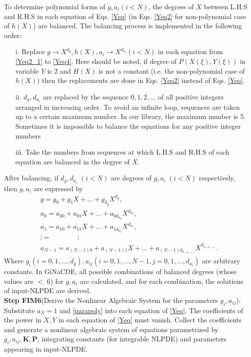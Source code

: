 \documentclass[prd,aps,floats,showkeys,nofootinbib,notitlepage]{revtex4}
\begin{document}
	To determine polynomial forms of $g,a_i(i<N)$, the degrees of $X$ between L.H.S and R.H.S in each equation of Eqs. \eqref{Yeq} (in Eqs. \eqref{Yeq2} for non-polynomial case of $h(X)$) are balanced. The balancing process is implemented in the following order:
	\begin{itemize}
		\item[i.] Replace $g\rightarrow X^{d_g},h(X),a_i\rightarrow X^{d_{a{_i}}}(i<N)$ in each equation from \eqref{Yeq2_1} to \eqref{Yeq4}. Here should be noted, if degree of $P(X(\xi),Y(\xi))$ in variable $Y$ is 2 and $H(X)$ is not a constant (i.e. the non-polynomial case of $h(X)$) then the replacements are done in Eqs. \eqref{Yeq2} instead of Eqs. \eqref{Yeq}.  
		\item[ii.]$d_g,d_{a_{i}}$ are replaced by the sequence $0,1, 2,\ldots$ of all positive integers arranged in increasing order. To avoid an infinite loop, sequences are taken up to a certain maximum number. In our library, the maximum number is 5. Sometimes it is impossible to balance the equations for any positive integer numbers 
		\item[iii.] Take the numbers from sequences at which L.H.S and R.H.S of each equation are balanced in the degree of $X$.
	\end{itemize}
	After balancing, if $d_{g}, d_{a_{i}}\;(i<N)$ are degrees of $g,a_{i}\;(i<N)$ respectively, then $g,a_{i}$ are expressed by
	\begin{subequations}\label{parapoly}
		\begin{align}
			\label{gpoly}&g=g_0+g_1X+\ldots+g_{d_g}X^{d_g},\\
			\label{a0poly}&a_{0}=a_{00}+a_{01}X+\ldots+a_{0d_{a_{0}}}X^{d_{a_{0}}},\\
			\label{a1poly}&a_{1}=a_{10}+a_{11}X+\ldots+a_{1d_{a_{1}}}X^{d_{a_{1}}},\\
			&\vdots=\;\;\;\;\;\;\;\;\;\;\;\;\;\;\vdots\nonumber\\
			\label{aNminus1poly}&a_{N-1}=a_{(N-1)0}+a_{(N-1)1}X+\ldots+a_{(N-1)d_{a_{(N-1)}}}X^{d_{a_{(N-1)}}}.
		\end{align}
	\end{subequations}
	Where $g_i(i=0,1,\ldots,d_g),a_{ij}(i=0,1,\ldots,N-1,j=0,1,\ldots,d_{a_{i}})$ are arbitrary constants.
	In GiNaCDE, all possible combinations of balanced degrees (whose values are $<$ 6) for $g,a_i$ are calculated, and for each combination, the solutions of input-NLPDE are derived.\\
	
	
	\textbf{Step FIM6}(Derive the Nonlinear Algebraic System for the parameters $g_i,a_{ij}$): Substitute $a_N=1$ and \eqref{parapoly} into each equation of \eqref{Yeq}. The coefficients of the power in $X,Y$ in each equation of \eqref{Yeq} must vanish. Collect the coefficients and generate a nonlinear algebraic system of equations parametrized by $g_i,a_{ij},\boldsymbol{K},\boldsymbol{P}$, integrating constants (for integrable NLPDE) and parameters appearing in input-NLPDE.\\
	
\end{document}
